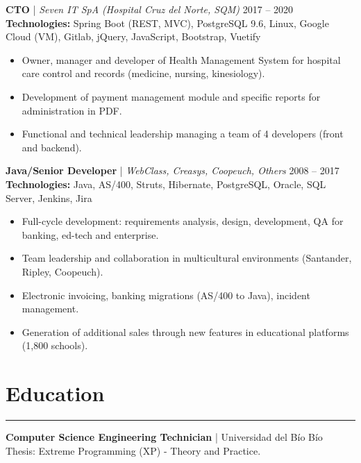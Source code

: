 \documentclass[11pt,a4paper]{article}
\begin{document}
\vspace{8pt}
\textbf{CTO} | \textit{Seven IT SpA (Hospital Cruz del Norte, SQM)} \hfill 2017 -- 2020 \\
\textbf{Technologies:} Spring Boot (REST, MVC), PostgreSQL 9.6, Linux, Google Cloud (VM), Gitlab, jQuery, JavaScript, Bootstrap, Vuetify \\
\begin{itemize}[noitemsep, topsep=0pt]
    \item Owner, manager and developer of Health Management System for hospital care control and records (medicine, nursing, kinesiology).
    \item Development of payment management module and specific reports for administration in PDF.
    \item Functional and technical leadership managing a team of 4 developers (front and backend).
\end{itemize}
\vspace{8pt}
\textbf{Java/Senior Developer} | \textit{WebClass, Creasys, Coopeuch, Others} \hfill 2008 -- 2017 \\
\textbf{Technologies:} Java, AS/400, Struts, Hibernate, PostgreSQL, Oracle, SQL Server, Jenkins, Jira \\
\begin{itemize}[noitemsep, topsep=0pt]
    \item Full-cycle development: requirements analysis, design, development, QA for banking, ed-tech and enterprise.
    \item Team leadership and collaboration in multicultural environments (Santander, Ripley, Coopeuch).
    \item Electronic invoicing, banking migrations (AS/400 to Java), incident management.
    \item Generation of additional sales through new features in educational platforms (1,800 schools).
\end{itemize}

\section*{Education}
\hrule
\vspace{5pt}
\textbf{Computer Science Engineering Technician} | Universidad del Bío Bío \\
Thesis: Extreme Programming (XP) - Theory and Practice.
\end{document}
